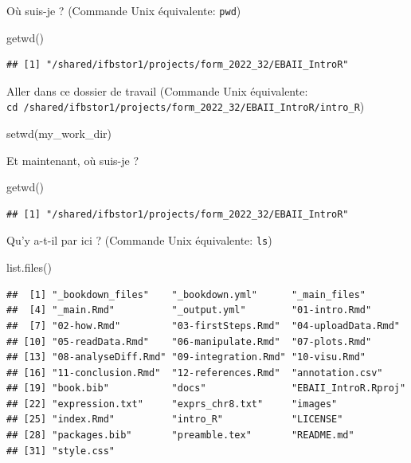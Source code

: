\documentclass[
]{book}
\newenvironment{Shaded}{\begin{snugshade}}{\end{snugshade}}
\newcommand{\FunctionTok}[1]{\textcolor[rgb]{0.00,0.00,0.00}{#1}}
\newcommand{\NormalTok}[1]{#1}
\begin{document}
Où suis-je ? (Commande Unix équivalente: \texttt{pwd})

\begin{Shaded}
\begin{Highlighting}[]
\FunctionTok{getwd}\NormalTok{()}
\end{Highlighting}
\end{Shaded}

\begin{verbatim}
## [1] "/shared/ifbstor1/projects/form_2022_32/EBAII_IntroR"
\end{verbatim}

Aller dans ce dossier de travail (Commande Unix équivalente: \texttt{cd\ /shared/ifbstor1/projects/form\_2022\_32/EBAII\_IntroR/intro\_R})

\begin{Shaded}
\begin{Highlighting}[]
\FunctionTok{setwd}\NormalTok{(my\_work\_dir)}
\end{Highlighting}
\end{Shaded}

Et maintenant, où suis-je ?

\begin{Shaded}
\begin{Highlighting}[]
\FunctionTok{getwd}\NormalTok{()}
\end{Highlighting}
\end{Shaded}

\begin{verbatim}
## [1] "/shared/ifbstor1/projects/form_2022_32/EBAII_IntroR"
\end{verbatim}

Qu'y a-t-il par ici ? (Commande Unix équivalente: \texttt{ls})

\begin{Shaded}
\begin{Highlighting}[]
\FunctionTok{list.files}\NormalTok{()}
\end{Highlighting}
\end{Shaded}

\begin{verbatim}
##  [1] "_bookdown_files"    "_bookdown.yml"      "_main_files"       
##  [4] "_main.Rmd"          "_output.yml"        "01-intro.Rmd"      
##  [7] "02-how.Rmd"         "03-firstSteps.Rmd"  "04-uploadData.Rmd" 
## [10] "05-readData.Rmd"    "06-manipulate.Rmd"  "07-plots.Rmd"      
## [13] "08-analyseDiff.Rmd" "09-integration.Rmd" "10-visu.Rmd"       
## [16] "11-conclusion.Rmd"  "12-references.Rmd"  "annotation.csv"    
## [19] "book.bib"           "docs"               "EBAII_IntroR.Rproj"
## [22] "expression.txt"     "exprs_chr8.txt"     "images"            
## [25] "index.Rmd"          "intro_R"            "LICENSE"           
## [28] "packages.bib"       "preamble.tex"       "README.md"         
## [31] "style.css"
\end{verbatim}
\end{document}
